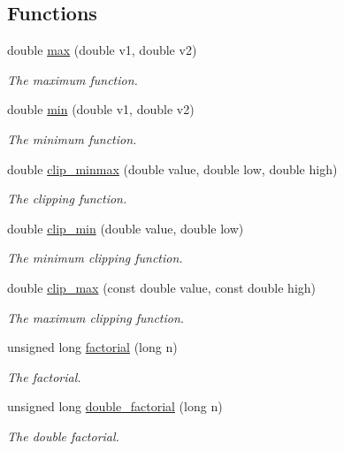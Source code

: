\subsection*{Functions}
\begin{DoxyCompactItemize}
\item 
double \hyperlink{namespace_hoa_a8ae91ded773030b88833f458d2bb1ea7}{max} (double v1, double v2)
\begin{DoxyCompactList}\small\item\em The maximum function. \end{DoxyCompactList}\item 
double \hyperlink{namespace_hoa_a487f41e24986445b8fdd699e48a53e6a}{min} (double v1, double v2)
\begin{DoxyCompactList}\small\item\em The minimum function. \end{DoxyCompactList}\item 
double \hyperlink{namespace_hoa_a39c13d16e0e94fcb80d8780c20d07151}{clip\-\_\-minmax} (double value, double low, double high)
\begin{DoxyCompactList}\small\item\em The clipping function. \end{DoxyCompactList}\item 
double \hyperlink{namespace_hoa_af11d8810d2d4eadcc5a06239bc12ab1b}{clip\-\_\-min} (double value, double low)
\begin{DoxyCompactList}\small\item\em The minimum clipping function. \end{DoxyCompactList}\item 
double \hyperlink{namespace_hoa_a70a614a6370140a970f5e94afd244100}{clip\-\_\-max} (const double value, const double high)
\begin{DoxyCompactList}\small\item\em The maximum clipping function. \end{DoxyCompactList}\item 
unsigned long \hyperlink{namespace_hoa_af38450480ab6d8c9cbeee21d0384d59a}{factorial} (long n)
\begin{DoxyCompactList}\small\item\em The factorial. \end{DoxyCompactList}\item 
unsigned long \hyperlink{namespace_hoa_a8a19fc23057ab1e829bcb83b8e9bf236}{double\-\_\-factorial} (long n)
\begin{DoxyCompactList}\small\item\em The double factorial. \end{DoxyCompactList}\item 

\end{DoxyCompactItemize}
